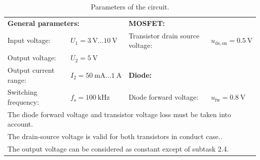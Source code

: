 \begin{table}[ht]
    \centering  %
    \begin{tabular}{llll}
        \toprule
        \multicolumn{2}{l}{\textbf{General parameters:}} & \multicolumn{2}{l}{\textbf{MOSFET:}}                                                                                                          \\
        Input voltage:                                   & $U_{\mathrm{1}} = \SI{3}{\volt} \ldots \SI{10}{\volt}$           & Transistor drain source voltage:    & $u_\mathrm{ds,on} = \SI{0.5}{\volt}$ \\
        Output voltage:                                  & $U_{\mathrm{2}} = \SI{5}{\volt}$                                 &                                     &                                      \\
        Output current range:                            & $I_{\mathrm{2}} = \SI{50}{\milli\ampere} \ldots \SI{1}{\ampere}$ & \multicolumn{2}{l}{\textbf{Diode:}}                                        \\
        Switching frequency:                             & $f_\mathrm{s} = \SI{100}{\kilo\hertz}$                           & Diode forward voltage:              & $u_\mathrm{fw} = \SI{0.8}{\volt}$    \\
        \midrule
        \multicolumn{4}{l}{\quad The diode forward voltage and transistor voltage loss must be taken into account.}                                                                                      \\
        \multicolumn{4}{l}{\quad The drain-source voltage is valid for both transistors in conduct case..}                                                                                               \\
        \multicolumn{4}{l}{\quad The output voltage can be considered as constant except of subtask 2.4.}                                                                                                \\
        \bottomrule
    \end{tabular}
    \caption{Parameters of the circuit.}  %
    \label{table:ex02_Parameters of the buck-boost converter}
\end{table}



